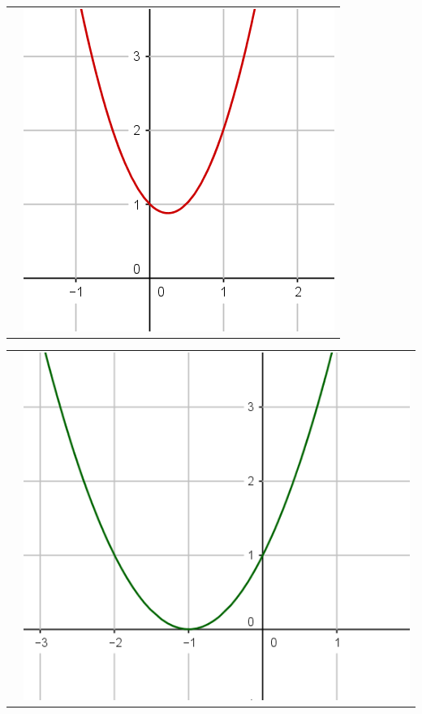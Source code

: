 \documentclass[12pt,a4paper]{article}
\date{}
\title{}
\begin{document}
\begin{tabular}{cc }
	 &
	
	\includegraphics[scale=0.3]{./img/fig_5}\\
\end{tabular}



\begin{tabular}{cc }
	 &
	
	\includegraphics[scale=0.25]{./img/fig_1}\\
\end{tabular}	
\end{document}
